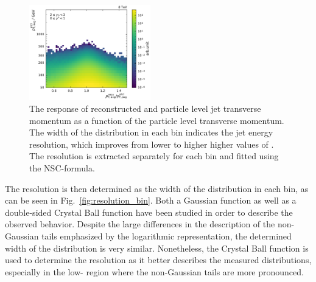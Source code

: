 \begin{figure}[htbp]
    \includegraphics[width=0.47\textwidth]{figures/measurement/gen_vs_reco_vs_gen_ptavg_yb2ys0.pdf}
    \caption[Comparison of particle level and reconstructed dijet transverse momentum]
            {The response of reconstructed and particle level jet transverse
                momentum as a function of the particle level transverse momentum.
                The width of the distribution in each \ptavg bin indicates the
                jet energy resolution, which improves from lower to higher higher values of \ptavg. The
                resolution is extracted separately for each bin and
                fitted using the NSC-formula.}
    \label{fig:gen_vs_reco_over_gen}
\end{figure}

The resolution is then determined as the width of the distribution in each \ptavg
bin, as can be seen in Fig.~\ref{fig:resolution_bin}. Both a Gaussian function
as well as a double-sided Crystal Ball function have been studied in order to
describe the observed behavior. Despite the large differences in the
description of the non-Gaussian tails emphasized by the logarithmic
representation, the determined width of the distribution is very similar.
Nonetheless, the Crystal Ball function is used to determine the resolution as
it better describes the measured distributions, especially in the low-\pt
region where the non-Gaussian tails are more pronounced.

